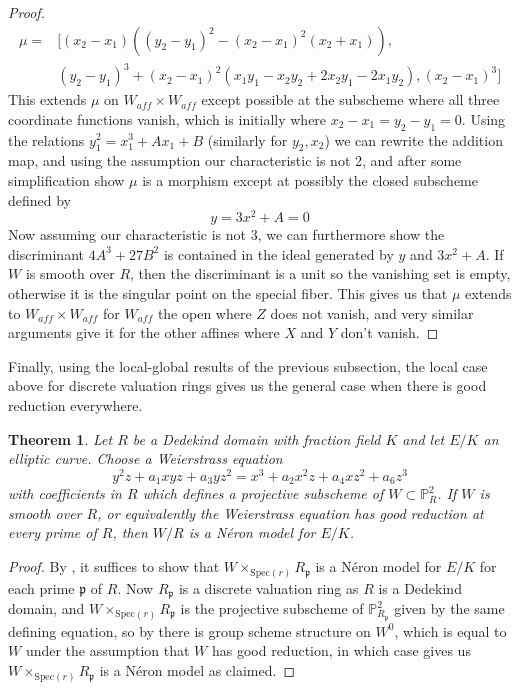 \documentclass{article}
\newtheorem{theorem}{Theorem}[section]
\theoremstyle{definition}
\theoremstyle{remark}
\theoremstyle{plain}
\newcommand{\mb}[1]{\mathbb{#1}}
\newcommand{\mk}[1]{\mathfrak{#1}}
\begin{document}
\begin{proof}
\begin{align*}
	\mu = &[(x_2 - x_1)((y_2 - y_1)^2 - (x_2 - x_1)^2(x_2+ x_1)),\\
		  &(y_2 - y_1)^3 + (x_2 - x_1)^2(x_1y_1 - x_2y_2 + 2x_2y_1 - 2x_1y_2), (x_2 - x_1)^3]
\end{align*}
This extends $\mu$ on $W_{aff} \times W_{aff}$ except possible at the subscheme where all three coordinate functions vanish, which is initially where $x_2 - x_1 = y_2 - y_1 = 0$.
Using the relations $y_1^2 = x_1^3 + Ax_1 + B$ (similarly for $y_2, x_2$) we can rewrite the addition map, and using the assumption our characteristic is not 2, and after some simplification show $\mu$ is a morphism except at possibly the closed subscheme defined by
\[y = 3x^2 + A = 0\]
Now assuming our characteristic is not 3, we can furthermore show the discriminant $4A^3 + 27B^2$ is contained in the ideal generated by $y$ and $3x^2 + A$.
If $W$ is smooth over $R$, then the discriminant is a unit so the vanishing set is empty, otherwise it is the singular point on the special fiber.
This gives us that $\mu$ extends to $W_{aff} \times W_{aff}$ for $W_{aff}$ the open where $Z$ does not vanish, and very similar arguments give it for the other affines where $X$ and $Y$ don't vanish.
\end{proof}

Finally, using the local-global results of the previous subsection, the local case above for discrete valuation rings gives us the general case when there is good reduction everywhere.

\begin{theorem}\label{theo:3.2}
	Let $R$ be a Dedekind domain with fraction field $K$ and let $E/K$ an elliptic curve.
	Choose a Weierstrass equation 
	\[y^2z + a_1xyz + a_3yz^2 = x^3 + a_2x^2z + a_4xz^2 + a_6z^3\]
	with coefficients in $R$ which defines a projective subscheme of $W \subset \mb{P}^2_R$.
	If $W$ is smooth over $R$, or equivalently the Weierstrass equation has good reduction at every prime of $R$, then $W/R$ is a N\'eron model for $E/K$.
\end{theorem}

\begin{proof}
	By , it suffices to show that $W \times_{\text{Spec}(r)} R_{\mk{p}}$ is a N\'eron model for $E/K$ for each prime $\mk{p}$ of $R$.
	Now $R_{\mk{p}}$ is a discrete valuation ring as $R$ is a Dedekind domain, and $W \times_{\text{Spec}(r)} R_{\mk{p}}$ is the projective subscheme of $\mb{P}^2_{R_{\mk{p}}}$ given by the same defining equation, so by  there is group scheme structure on $W^0$, which is equal to $W$ under the assumption that $W$ has good reduction, in which case  gives us $W \times_{\text{Spec}(r)} R_{\mk{p}}$  is a N\'eron model as claimed.
\end{proof}
\end{document}
